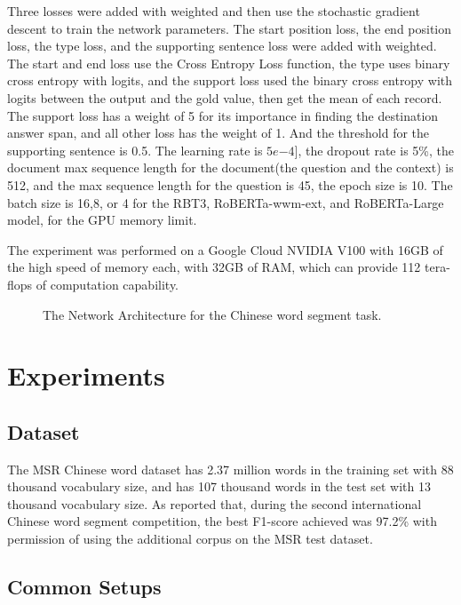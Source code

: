 \documentclass[11pt,a4paper]{article}
\begin{document}
Three losses were added with weighted and then use the stochastic gradient descent to train the network parameters.
The start position loss, the end position loss, the type loss, and the supporting sentence loss were added with weighted.
The start and end loss use the Cross Entropy Loss function, the type uses binary cross entropy with logits,
and the support loss used the binary cross entropy with logits between the output and the gold value, then get the mean of each record.
The support loss has a weight of 5 for its importance in finding the destination answer span, and all other loss has the weight of 1.
And the threshold for the supporting sentence is 0.5.
The learning rate is $5e{-4]}$, the dropout rate is 5\%, the document max sequence length for the document(the question and the context) is 512, and the max sequence length for the question is 45, the epoch size is 10.
The batch size is 16,8, or 4 for the RBT3, RoBERTa-wwm-ext, and RoBERTa-Large model, for the GPU memory limit.

The experiment was performed on a Google Cloud NVIDIA V100 with 16GB of the high speed of memory each, with 32GB of RAM,
which can provide 112 tera-flops of computation capability.


\begin{figure*}
\begin{center}
\end{center}
   \caption{The Network Architecture for the Chinese word segment task.}
\label{fig:short}
\end{figure*}

\section{Experiments}

\subsection{Dataset}

 The MSR Chinese word dataset has 2.37 million words in the training set with 88 thousand vocabulary size,
 and has 107 thousand words in the test set with 13 thousand vocabulary size.
 As \citet{emerson2005second} reported that, during the second international Chinese word segment competition,
the best F1-score achieved was 97.2\% with permission of using the additional corpus on the MSR test dataset.

\subsection{Common Setups}
\end{document}
